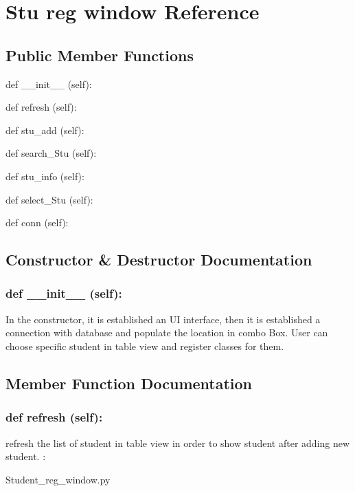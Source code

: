 \hypertarget{Stu_reg_window}{\section{Stu reg window Reference}
\label{Stu_reg_window}
}
\subsection*{Public Member Functions}
\begin{DoxyCompactItemize}
\item 
def {\_\_init\_\_} (self):
\item 
def {refresh} (self):
\item 
def {stu\_add} (self):
\item 
def {search\_Stu} (self):
\item 
def {stu\_info} (self):
\item 
def {select\_Stu} (self):
\item 
def {conn} (self):
\end{DoxyCompactItemize}

\subsection{Constructor \& Destructor Documentation}
\hypertarget{class_poly_aa3def076b74bed67904976ad4f9fe9b1}{
\subsubsection[{def __init__ (self):}]{\setlength{\rightskip}{0pt plus 5cm}def {\_\_init\_\_} (self): 
}}
In the constructor, it is established an UI interface, then it is  established a connection with database and populate the location in combo Box. User can choose specific student in table view and register classes for them.
 
\subsection{Member Function Documentation}
\hypertarget{class_poly_a14a7ad77ce612b0c54f531d307ee4b39}{
\subsubsection[{def refresh (self):}]{\setlength{\rightskip}{0pt plus 5cm}def {refresh} (self):}}\label{class_poly_a14a7ad77ce612b0c54f531d307ee4b39}
refresh the list of student in table view in order to show student after adding new student.
:\begin{DoxyCompactItemize}
\item 
Student\_reg\_window.\-py\end{DoxyCompactItemize}

